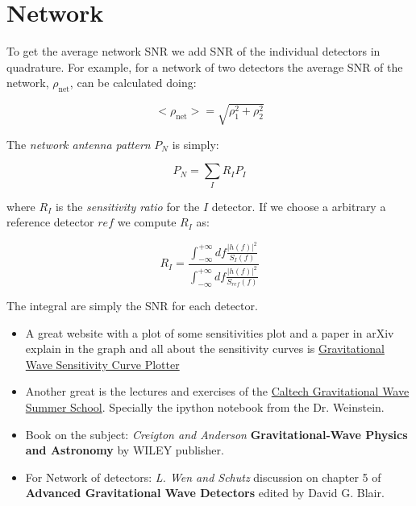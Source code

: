 \documentclass[11pt,fleqn]{book} %
\begin{document}
\section{Network}

To get the average network SNR we add SNR of the individual detectors in quadrature. For example, for a network of two detectors the average SNR of the network, $\rho_{\text{net}}$, can be calculated doing:

\begin{equation}
	<\rho_{\text{net}}> = \sqrt{\rho_{1} ^2 + \rho_{2}^2}
\end{equation}


The  \emph{network antenna pattern} $P_N$ is simply:

\begin{equation}
	P_N = \sum _I R_I P_I
\end{equation}

where $R_I$ is the \emph{sensitivity ratio} for the $I$ detector. If we choose a arbitrary a  reference detector $ref$ we compute $R_I$ as:

\begin{equation}
R_I = \frac{\int ^ {+ \infty} _ {- \infty} df \frac{|h(f)|^2}{S_I(f)}} {\int ^ {+ \infty} _ {- \infty} df \frac{|h(f)|^2}{S_{ref}(f)}} 
\end{equation}

The integral are simply the SNR for each detector. 



\begin{remark}
	\begin{itemize}
		\item A great website with a plot of some sensitivities plot and a paper in arXiv explain in the graph and all about the sensitivity curves is \href{http://arxiv.org/abs/1408.0740}{Gravitational Wave Sensitivity Curve Plotter}\\
	\item Another great is the lectures and exercises of the \href{www.algo.com}{Caltech Gravitational Wave Summer School}. Specially the ipython notebook from the Dr. Weinstein.\\
	\item Book on the subject: \emph{Creigton and Anderson} \textbf{Gravitational-Wave Physics and Astronomy} by WILEY publisher.\\ 

	\item For Network of detectors: \emph{L. Wen and Schutz} discussion on chapter 5 of \textbf{Advanced Gravitational Wave Detectors} edited by David G. Blair.

\end{itemize}
\end{remark}
\end{document}
